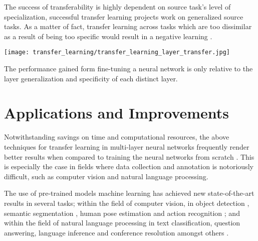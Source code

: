 The success of transferability is highly dependent on source task's level of specialization, successful transfer learning projects work on generalized source tasks. As a matter of fact, transfer learning across tasks which are too dissimilar as a result of being too specific would result in a negative learning \citep{rosenstein2005}.

\begin{marginfigure}
  \texttt{[image: transfer\_learning/transfer\_learning\_layer\_transfer.jpg]}
  \caption{The performance gained form fine-tuning a neural network is only relative to the layer generalization and specificity of each distinct layer.}
  \label{fig:transferlearning_pretrained_finetuning}
\end{marginfigure}

\section{Applications and Improvements}\label{sec:transfer-learning-applications-improvements}

Notwithstanding savings on time and computational resources, the above techniques for transfer learning in multi-layer neural networks frequently render better results when compared to training the neural networks from scratch \citep{yosinski2014}. This is especially the case in fields where data collection and annotation is notoriously difficult, such as computer vision and natural language processing. 

The use of pre-trained models machine learning has achieved new state-of-the-art results in several tasks; within the field of computer vision, in object detection \citep{he2017}, semantic segmentation \citep{zhao2016}, human pose estimation \citep{papandreou2017} and action recognition \citep{carreira2017} ; and within the field of natural language processing in text classification, question answering, language inference and conference resolution amongst others \citep{howard2018} \citep{joshi2018}. 

